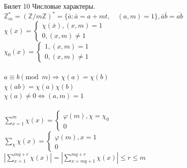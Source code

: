 \documentclass[a4paper,12pt]{article}
\newcommand{\ee}{\equiv}
\newcommand{\FI}{\varphi}
\newcommand{\q}{\quad}
\newcommand{\Ra}{\Rightarrow}
\newcommand{\bb}[1]{\mathbb{#1}}
\newcommand{\SL}{\sum\limits}
\newcommand{\os}{\left(}
\newcommand{\cs}{\right)}
\begin{document}
\begin{mybox2}{{Билет 10}}
Числовые характеры.\\
$\bb{Z}_m^* = \os \bb{Z}/m\bb{Z}  \cs^* = \{\bar{a}: \bar{a} = a + mt,\q (a,m) = 1 \}, \bar{a}\bar{b} = \overline{ab}  $\\
$\chi(x) = \begin{cases} \chi(\bar{x}), (x,m)=1\\0,(x,m) \not=1 \end{cases} $\\
$\chi_0(x) = \begin{cases} 1, (x,m)=1\\0,(x,m) \not=1 \end{cases} $\\\q\\
$a\ee b \pmod{m} \Ra \chi(a) = \chi(b) $\\
$\chi(ab) = \chi(a)\chi(b) $\\
$\chi(a)\not=0 \iff (a,m)=1$\\\q\\
$\SL_{x=1}^m \chi(x) = \begin{cases} \FI(m), \chi = \chi_0\\0 \end{cases} $\\
$\SL_{\chi} \chi(x) = \begin{cases} \FI(m), x = 1\\0 \end{cases} $\\
$\left|\SL_{x=1}^{mq+r} \chi(x) \right| = \left|\SL_{x=mq+1}^{mq+r} \chi(x)\right|\le r\le m$
\end{mybox2}
\end{document}
